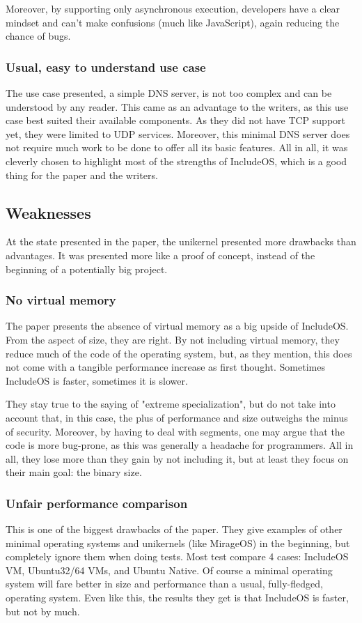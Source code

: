 \documentclass[12pt]{article}
\begin{document}
Moreover, by supporting only asynchronous execution, developers have a clear mindset and can't make confusions (much like JavaScript),
again reducing the chance of bugs.

\subsubsection{Usual, easy to understand use case}
The use case presented, a simple DNS server, is not too complex and can be understood by any reader. This came as an advantage to the
writers, as this use case best suited their available components. As they did not have TCP support yet, they were limited to UDP services.
Moreover, this minimal DNS server does not require much work to be done to offer all its basic features. All in all, it was cleverly
chosen to highlight most of the strengths of IncludeOS, which is a good thing for the paper and the writers.

\subsection{Weaknesses}
At the state presented in the paper, the unikernel presented more drawbacks than advantages. It was presented more like a proof of
concept, instead of the beginning of a potentially big project.

\subsubsection{No virtual memory}
The paper presents the absence of virtual memory as a big upside of IncludeOS. From the aspect of size, they are right. By not including
virtual memory, they reduce much of the code of the operating system, but, as they mention, this does not come with a tangible performance
increase as first thought. Sometimes IncludeOS is faster, sometimes it is slower.

They stay true to the saying of "extreme specialization", but do not take into account that, in this case, the plus of performance and size
outweighs the minus of security. Moreover, by having to deal with segments, one may argue that the code is more bug-prone, as this was
generally a headache for programmers. All in all, they lose more than they gain by not including it, but at least they focus on their main
goal: the binary size.

\subsubsection{Unfair performance comparison}
This is one of the biggest drawbacks of the paper. They give examples of other minimal operating systems and unikernels (like MirageOS) in
the beginning, but completely ignore them when doing tests. Most test compare 4 cases: IncludeOS VM, Ubuntu32/64 VMs, and Ubuntu Native.
Of course a minimal operating system will fare better in size and performance than a usual, fully-fledged, operating system. Even like
this, the results they get is that IncludeOS is faster, but not by much.
\end{document}
